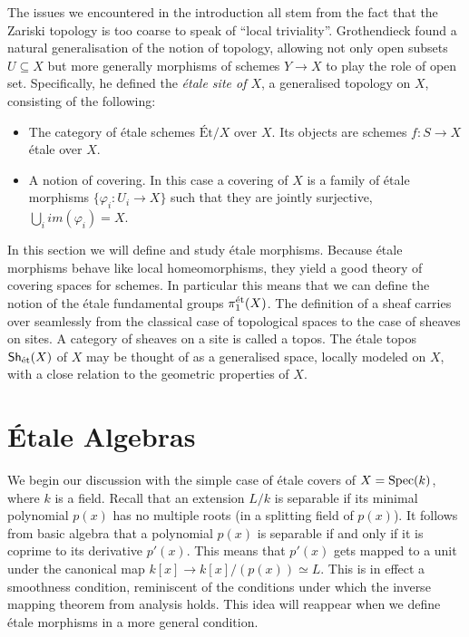 The issues we encountered in the introduction all stem from the fact that the Zariski topology is too coarse to speak of ``local triviality''. Grothendieck found a natural generalisation of the notion of topology, allowing not only open subsets $U \subseteq X$ but more generally morphisms of schemes $Y \to X$ to play the role of open set. Specifically, he defined the \textit{\'etale site of $X$}, a generalised topology on $X$, consisting of the following:

\begin{itemize}
	\item The category of \'etale schemes $\text{\'Et}/X$ over $X$. Its objects are schemes $f:S \to X$ \'etale over $X$.
	\item A notion of covering. In this case a covering of $X$ is a family of \'etale morphisms $\{\varphi_i: U_i \to X\}$ such that they are jointly surjective, $\bigcup_i im(\varphi_i) = X$.
\end{itemize}

In this section we will define and study \'etale morphisms. Because \'etale morphisms behave like local homeomorphisms, they yield a good theory of covering spaces for schemes. In particular this means that we can define the notion of the \'etale fundamental groups $\pi_1^{\text{\'et}}(X)$. The definition of a sheaf carries over seamlessly from the classical case of topological spaces to the case of sheaves on sites. A category of sheaves on a site is called a topos. The \'etale topos $\mathsf{Sh}_{\text{\'et}}(X)$ of $X$ may be thought of as a generalised space, locally modeled on $X$, with a close relation to the geometric properties of $X$.

\section{\'Etale Algebras}
We begin our discussion with the simple case of \'etale covers of $X = \operatorname{Spec}(k)$, where $k$ is a field. Recall that an extension $L/k$ is separable if its minimal polynomial $p(x)$ has no multiple roots (in a splitting field of $p(x)$). It follows from basic algebra that a polynomial $p(x)$ is separable if and only if it is coprime to its derivative $p'(x)$. This means that $p'(x)$ gets mapped to a unit under the canonical map $k[x] \to k[x]/(p(x)) \simeq L$. This is in effect a smoothness condition, reminiscent of the conditions under which the inverse mapping theorem from analysis holds. This idea will reappear when we define \'etale morphisms in a more general condition.

